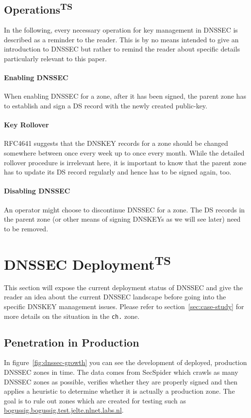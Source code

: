 \documentclass[a4paper,twocolumn]{scrartcl}
\newcommand{\wbts}{\textsuperscript{TS}}
\begin{document}
 
\subsection{Operations\wbts}
In the following, every necessary operation for key management in
DNSSEC is described as a reminder to the reader. This is by no means
intended to give an introduction to DNSSEC but rather to remind the
reader about specific details particularly relevant to this paper.

\paragraph{Enabling DNSSEC} When enabling DNSSEC for a zone, after it
has been signed, the parent zone has to establish and sign a DS record
with the newly created public-key.

\paragraph{Key Rollover} RFC4641 \cite{RFC4641} suggests that the DNSKEY
records for a zone should be changed somewhere between once every week
up to once every month. While the detailed rollover procedure is
irrelevant here, it is important to know that the parent zone has to
update its DS record regularly and hence has to be signed again, too.

\paragraph{Disabling DNSSEC} An operator might choose to discontinue
DNSSEC for a zone. The DS records in the parent zone (or other means
of signing DNSKEYs as we will see later) need to be removed.

\section{DNSSEC Deployment\wbts}

This section will expose the current deployment status of DNSSEC and
give the reader an idea about the current DNSSEC landscape before
going into the specific DNSKEY management issues. Please refer to
section~\ref{sec:case-study} for more details on the situation in the
\verb|ch.| zone.

\subsection{Penetration in Production}
In figure~\ref{fig:dnssec-growth} you can see the development of
deployed, production DNSSEC zones in time. The data comes from
SecSpider \cite{secspider} which crawls as many DNSSEC zones as
possible, verifies whether they are properly signed and then applies a
heuristic to determine whether it is actually a production zone. The
goal is to rule out zones which are created for testing such as
\url{bogussig.bogussig.test.jelte.nlnet.labs.nl}.
\end{document}
